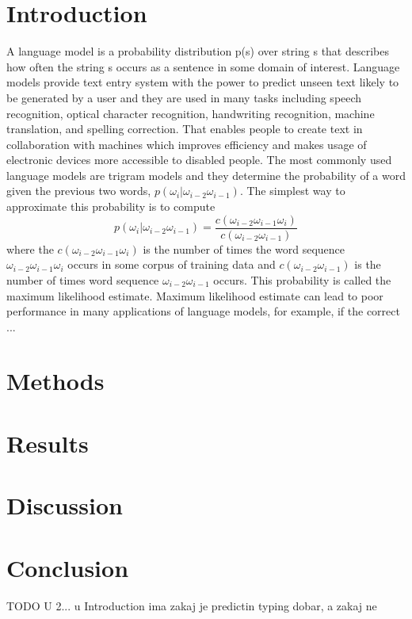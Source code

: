 \documentclass[twoside]{article}
\begin{document}
\begin{multicols}{2}

\section{Introduction}
A language model is a probability distribution p(s) over string s that describes how often the string s occurs as a sentence in some domain of interest. 
Language models provide text entry system with the power to predict unseen text likely to be generated by a user and they are used in many tasks including speech recognition, optical character recognition, handwriting recognition, machine translation, and spelling correction.  That enables people to create text in collaboration with machines which improves efficiency and makes usage of electronic devices more accessible to disabled people. The most commonly used language models are trigram models and they determine the probability of a word given the previous two words, $ p(\omega_i|\omega_{i-2}\omega_{i-1}) $. The simplest way to approximate this probability is to compute 
\begin{equation}
p(\omega_i|\omega_{i-2}\omega_{i-1}) = \frac{c(\omega_{i-2}\omega_{i-1}\omega_i)}{c(\omega_{i-2}\omega_{i-1})}
\end{equation}
where the $ c(\omega_{i-2}\omega_{i-1}\omega_i) $ is the number of times the word sequence $ \omega_{i-2}\omega_{i-1}\omega_i $ occurs in some corpus of training data and $ c(\omega_{i-2}\omega_{i-1}) $ is the number of times word sequence $ \omega_{i-2}\omega_{i-1} $ occurs. This probability is called the maximum likelihood estimate. Maximum likelihood estimate can lead to poor performance in many applications of language models, for example, if the correct ... 

\section{Methods}


\section{Results}

\section{Discussion}

\section{Conclusion}
TODO U 2... u Introduction ima zakaj je predictin typing dobar, a zakaj ne


{}
\nocite{*}



\end{multicols}
\end{document}
